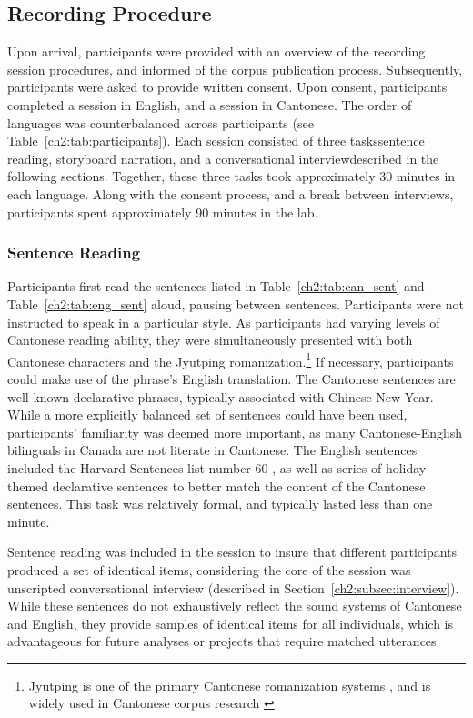 \subsection{Recording Procedure}\label{ch2:subsec:procedure}
Upon arrival, participants were provided with an overview of the recording session procedures, and informed of the corpus publication process. Subsequently, participants were asked to provide written consent. Upon consent, participants completed a session in English, and a session in Cantonese. The order of languages was counterbalanced across participants (see Table~\ref{ch2:tab:participants}). Each session consisted of three tasks\textemdash sentence reading, storyboard narration, and a conversational interview\textemdash described in the following sections. Together, these three tasks took approximately 30 minutes in each language. Along with the consent process, and a break between interviews, participants spent approximately 90 minutes in the lab.

\subsubsection{Sentence Reading}\label{ch2:subsec:sentences}
Participants first read the sentences listed in Table~\ref{ch2:tab:can_sent} and Table~\ref{ch2:tab:eng_sent} aloud, pausing between sentences. Participants were not instructed to speak in a particular style. As participants had varying levels of Cantonese reading ability, they were simultaneously presented with both Cantonese characters and the Jyutping romanization.\footnote{Jyutping is one of the primary Cantonese romanization systems \citep{matthews_2013_cantonese}, and is widely used in Cantonese corpus research \citep{nagy_2011_hlvc,tse_2019_heritage}} If necessary, participants could make use of the phrase's English translation. The Cantonese sentences are well-known declarative phrases, typically associated with Chinese New Year. While a more explicitly balanced set of sentences could have been used, participants' familiarity was deemed more important, as many Cantonese-English bilinguals in Canada are not literate in Cantonese. The English sentences included the Harvard Sentences list number 60 \citep{ieee_1969_sentences}, as well as series of holiday-themed declarative sentences to better match the content of the Cantonese sentences. This task was relatively formal, and typically lasted less than one minute. 

Sentence reading was included in the session to insure that different participants produced a set of identical items, considering the core of the session was unscripted conversational interview (described in Section~\ref{ch2:subsec:interview}). While these sentences do not exhaustively reflect the sound systems of Cantonese and English, they provide samples of identical items for all individuals, which is advantageous for future analyses or projects that require matched utterances.

